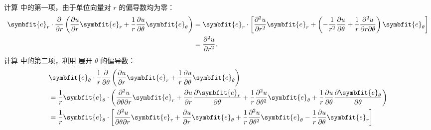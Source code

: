 \begin{solution}
\begin{equation}
\begin{aligned}
        \end{aligned}
    \end{equation}
    计算  中的第一项，由于单位向量对 $r$ 的偏导数均为零：
    \begin{equation}
        \label{eq:first-term-9}
        \begin{aligned}
            \symbfit{e}_r \cdot \frac{\partial}{\partial r} \left( \frac{\partial u}{\partial r} \symbfit{e}_r + \frac{1}{r} \frac{\partial u}{\partial \theta} \symbfit{e}_\theta \right) & = \symbfit{e}_r \cdot \left[ \frac{\partial^2 u}{\partial r^2} \symbfit{e}_r + \left( -\frac{1}{r^2} \frac{\partial u}{\partial \theta} + \frac{1}{r} \frac{\partial^2 u}{\partial r \partial \theta} \right) \symbfit{e}_\theta \right] \\
                                                                                                                                                                                           & = \frac{\partial^2 u}{\partial r^2}.
        \end{aligned}
    \end{equation}
    计算  中的第二项，利用  展开 $\theta$ 的偏导数：
    \begin{equation}
        \label{eq:second-term-10}
        \begin{aligned}
             & \symbfit{e}_\theta \cdot \frac{1}{r} \frac{\partial}{\partial \theta} \left( \frac{\partial u}{\partial r} \symbfit{e}_r + \frac{1}{r} \frac{\partial u}{\partial \theta} \symbfit{e}_\theta \right)                                                                                                                                                                            \\
             & = \frac{1}{r} \symbfit{e}_\theta \cdot \left( \frac{\partial^2 u}{\partial \theta \partial r} \symbfit{e}_r + \frac{\partial u}{\partial r} \frac{\partial \symbfit{e}_r}{\partial \theta} + \frac{1}{r} \frac{\partial^2 u}{\partial \theta^2} \symbfit{e}_\theta + \frac{1}{r} \frac{\partial u}{\partial \theta} \frac{\partial \symbfit{e}_\theta}{\partial \theta} \right) \\
             & = \frac{1}{r} \symbfit{e}_\theta \cdot \left[ \frac{\partial^2 u}{\partial \theta \partial r} \symbfit{e}_r + \frac{\partial u}{\partial r} \symbfit{e}_\theta + \frac{1}{r} \frac{\partial^2 u}{\partial \theta^2} \symbfit{e}_\theta - \frac{1}{r} \frac{\partial u}{\partial \theta} \symbfit{e}_r \right]                                                                   \\

\end{aligned}
\end{equation}
\end{solution}
